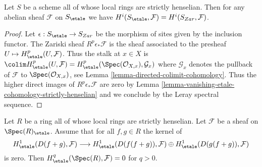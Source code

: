 \begin{lemma}
\label{lemma-local-rings-strictly-henselian}
Let $S$ be a scheme all of whose local rings are strictly henselian.
Then for any abelian sheaf $\mathcal{F}$ on $S_\etale$ we have
$H^i(S_\etale, \mathcal{F}) = H^i(S_{Zar}, \mathcal{F})$.
\end{lemma}

\begin{proof}
Let $\epsilon : S_\etale \to S_{Zar}$ be the morphism of sites given
by the inclusion functor. The Zariski sheaf $R^p\epsilon_*\mathcal{F}$
is the sheaf associated to the presheaf $U \mapsto H^p_\etale(U, \mathcal{F})$.
Thus the stalk at $x \in X$ is
$\colim H^p_\etale(U, \mathcal{F}) =
H^p_\etale(\Spec(\mathcal{O}_{X, x}), \mathcal{G}_x)$
where $\mathcal{G}_x$ denotes the pullback of $\mathcal{F}$
to $\Spec(\mathcal{O}_{X, x})$, see
Lemma \ref{lemma-directed-colimit-cohomology}.
Thus the higher direct images of $R^p\epsilon_*\mathcal{F}$ are
zero by
Lemma \ref{lemma-vanishing-etale-cohomology-strictly-henselian}
and we conclude by the Leray spectral sequence.
\end{proof}

\begin{lemma}
\label{lemma-gabber-criterion}
Let $R$ be a ring all of whose local rings are strictly henselian.
Let $\mathcal{F}$ be a sheaf on $\Spec(R)_\etale$.
Assume that for all $f, g \in R$ the kernel of
$$
H^1_\etale(D(f + g), \mathcal{F})
\longrightarrow
H^1_\etale(D(f(f + g)), \mathcal{F}) \oplus
H^1_\etale(D(g(f + g)), \mathcal{F})
$$
is zero. Then $H^q_\etale(\Spec(R), \mathcal{F}) = 0$ for $q > 0$.
\end{lemma}

